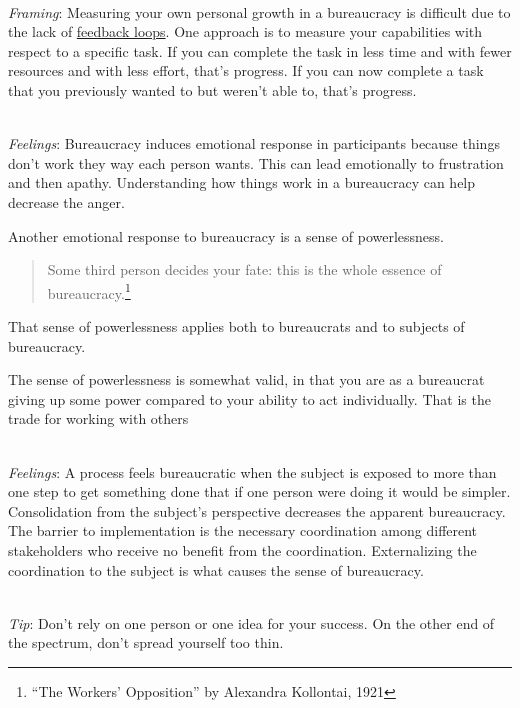 \ \\
\textit{Framing}: Measuring your own personal growth in a bureaucracy is difficult due to the lack of \hyperref[sec:feedback-loop-and-ripples]{feedback loops}. One approach is to measure your capabilities with respect to a specific task. If you can complete the task in less time and with fewer resources and with less effort, that's progress. If you can now complete a task that you previously wanted to but weren't able to, that's progress.


\ \\
\textit{Feelings}: Bureaucracy induces emotional response in participants because things don't work they way each person wants. This can lead emotionally to frustration and then apathy. Understanding how things work in a bureaucracy can help decrease the anger.


Another emotional response to bureaucracy is a sense of powerlessness. 
\begin{quote}
Some third person decides your fate: this is the whole essence of bureaucracy.\footnote{``The Workers' Opposition'' by Alexandra Kollontai, 1921}
\end{quote}
That sense of powerlessness applies both to bureaucrats and to subjects of bureaucracy. 

The sense of powerlessness is somewhat valid, in that you are as a bureaucrat giving up some power compared to your ability to act individually. That is the trade for working with others

\ \\
\textit{Feelings}: A process feels bureaucratic when the subject is exposed to more than one step to get something done that if one person were doing it would be simpler. Consolidation from the subject's perspective decreases the apparent bureaucracy. The barrier to implementation is the necessary coordination among different stakeholders who receive no benefit from the coordination. Externalizing the coordination to the subject is what causes the sense of bureaucracy. 


\ \\
\textit{Tip}: Don't rely on one person or one idea for your success. On the other end of the spectrum, don't spread yourself too thin. 

